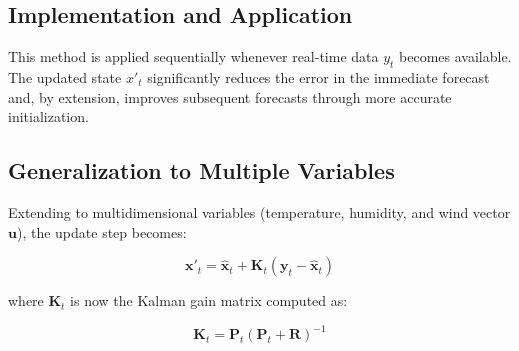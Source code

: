 \documentclass[12pt,a4paper]{article}
\begin{document}
\subsection{Implementation and Application}
This method is applied sequentially whenever real-time data $y_t$ becomes available. The updated state $x'_t$ significantly reduces the error in the immediate forecast and, by extension, improves subsequent forecasts through more accurate initialization.

\subsection{Generalization to Multiple Variables}
Extending to multidimensional variables (temperature, humidity, and wind vector $\mathbf{u}$), the update step becomes:

\begin{equation}
\mathbf{x}'_t = \hat{\mathbf{x}}_t + \mathbf{K}_t(\mathbf{y}_t - \hat{\mathbf{x}}_t)
\end{equation}

where $\mathbf{K}_t$ is now the Kalman gain matrix computed as:

\begin{equation}
\mathbf{K}_t = \mathbf{P}_t(\mathbf{P}_t + \mathbf{R})^{-1}
\end{equation}
\end{document}
